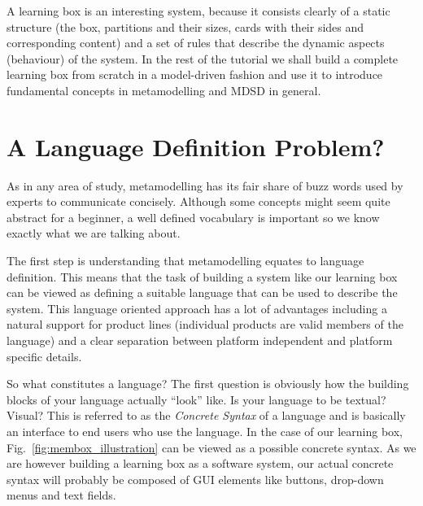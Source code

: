 A learning box is an interesting system, because it consists clearly of a static structure (the box, partitions and their sizes, cards with their sides and corresponding content) and a set of rules that describe the dynamic aspects 
(behaviour) of the system.  
In the rest of the tutorial we shall build a complete learning box from scratch in a model-driven fashion and use it to introduce fundamental concepts in metamodelling and MDSD in general.  

\section{A Language Definition Problem?}

As in any area of study, metamodelling has its fair share of buzz words used by experts to communicate concisely.  Although some concepts might seem quite abstract for a beginner, a well defined vocabulary is important so we know
exactly what we are talking about.   

The first step is understanding that metamodelling equates to language definition.
This means that the task of building a system like our learning box can be viewed as defining a suitable language that can be used to describe the system.
This language oriented approach has a lot of advantages including a natural support for product lines (individual products are valid members of the language) and a clear separation between platform independent and platform specific details.      

So what constitutes a language?  The first question is obviously  how the building blocks of your language actually ``look'' like.  
Is your language to be textual?  Visual?  This is referred to as the \emph{Concrete Syntax} of a language and is basically an interface to end users who use the language.  
In the case of our learning box, Fig.~\ref{fig:membox_illustration} can be viewed as a possible concrete syntax.
As we are however building a learning box as a software system, our actual concrete syntax  will probably be composed of GUI elements like buttons, drop-down menus and text fields.   

